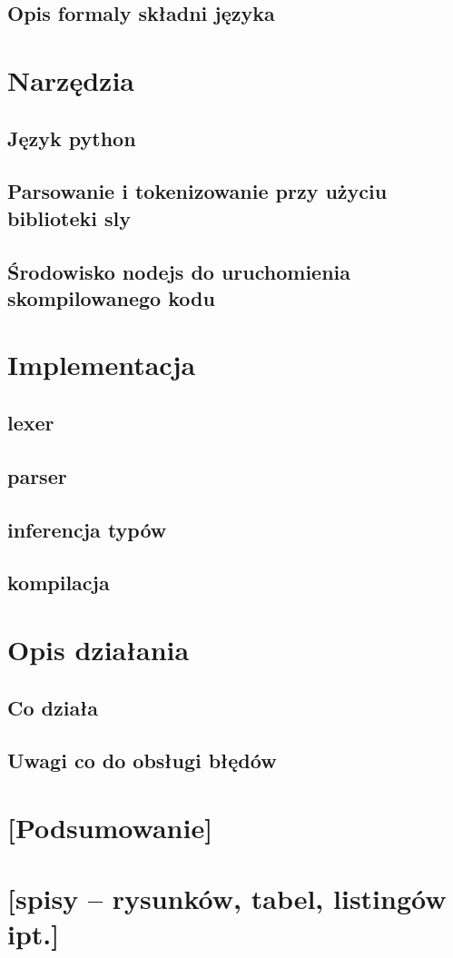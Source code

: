 \documentclass{article}
\begin{document}
\subsection{Opis formaly składni języka}
\section{Narzędzia}
\subsection{Język python}
\subsection{Parsowanie i tokenizowanie przy użyciu biblioteki sly}
\subsection{Środowisko nodejs do uruchomienia skompilowanego kodu}
\section{Implementacja}
\subsection{lexer}
\subsection{parser}
\subsection{inferencja typów}
\subsection{kompilacja}
\section{Opis działania}
\subsection{Co działa}
\subsection{Uwagi co do obsługi błędów}
\section{[Podsumowanie]}
\section{[spisy -- rysunków, tabel, listingów ipt.]}


\end{document}
